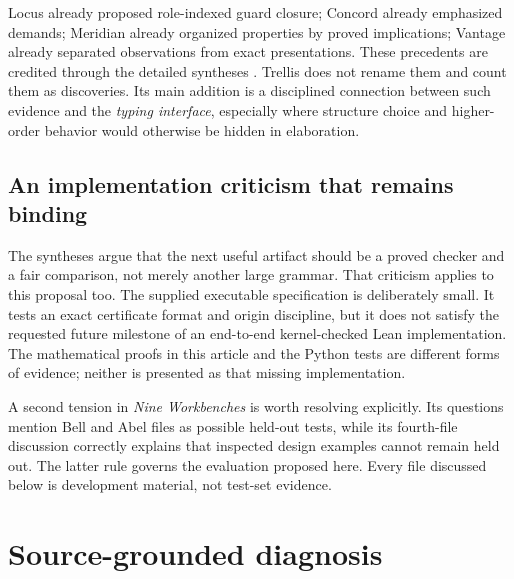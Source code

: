 \documentclass[11pt,a4paper]{article}
\theoremstyle{definition}
\theoremstyle{remark}
\begin{document}
Locus already proposed role-indexed guard closure; Concord already emphasized demands; Meridian already organized properties by proved implications; Vantage already separated observations from exact presentations. These precedents are credited through the detailed syntheses \cite{synA,synB}. Trellis does not rename them and count them as discoveries. Its main addition is a disciplined connection between such evidence and the \emph{typing interface}, especially where structure choice and higher-order behavior would otherwise be hidden in elaboration.

\subsection{An implementation criticism that remains binding}
The syntheses argue that the next useful artifact should be a proved checker and a fair comparison, not merely another large grammar. That criticism applies to this proposal too. The supplied executable specification is deliberately small. It tests an exact certificate format and origin discipline, but it does not satisfy the requested future milestone of an end-to-end kernel-checked Lean implementation. The mathematical proofs in this article and the Python tests are different forms of evidence; neither is presented as that missing implementation.

A second tension in \emph{Nine Workbenches} is worth resolving explicitly. Its questions mention Bell and Abel files as possible held-out tests, while its fourth-file discussion correctly explains that inspected design examples cannot remain held out. The latter rule governs the evaluation proposed here. Every file discussed below is development material, not test-set evidence.

\section{Source-grounded diagnosis}
\label{sec:sources}
\end{document}
